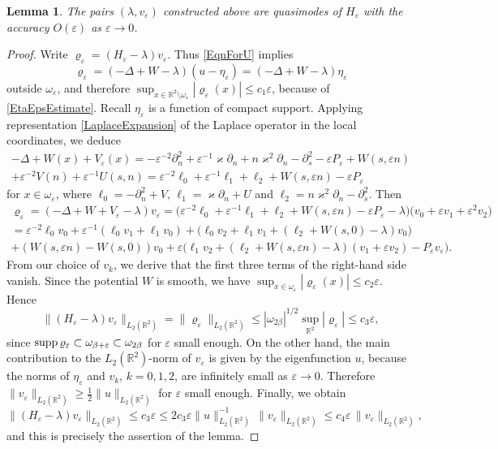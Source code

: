 \documentclass[reqno]{amsart}
\theoremstyle{plain}
\newtheorem{lem}{Lemma}
\numberwithin{equation}{section}
\newcommand{\supp}{\mathop{\rm supp}}
\renewcommand{\kappa}{\varkappa}
\newcommand{\Real}{\mathbb R}
\newcommand{\eps}{\varepsilon}
\renewcommand{\leq}{\leqslant}
\renewcommand{\geq}{\geqslant}
\begin{document}
\begin{lem}\label{LemmaQuasimodesHeps}
 The pairs $(\lambda, v_\eps)$ constructed above are quasimodes of $H_\eps$ with the accuracy $O(\eps)$ as $\eps\to 0$.
\end{lem}
\begin{proof}



Write $\varrho_\eps=(H_\eps-\lambda)v_\eps$.
Thus \eqref{EqnForU} implies
\begin{equation*}
 \varrho_\eps=(-\Delta+W-\lambda)( u-\eta_\eps)=(-\Delta+W-\lambda)\eta_\eps
\end{equation*}
outside $\omega_\eps$, and therefore $\sup_{x\in\Real^2\setminus \omega_\eps}|\varrho_\eps(x)|\leq c_1\eps$, because of \eqref{EtaEpsEstimate}. Recall $\eta_\eps$ is a function of compact support.
Applying representation \eqref{LaplaceExpansion} of the Laplace operator in the local coordinates, we deduce
\begin{multline*}
-\Delta+W(x)+V_\eps(x)
=-\eps^{-2}\partial^2_n+\eps^{-1}\kappa\partial_n
+n\kappa^2\partial_n-\partial^2_s-\eps P_\eps
+W(s,\eps n)\\
+ \eps^{-2}V(n)+\eps^{-1}U(s,n) =\eps^{-2}\ell_0+\eps^{-1}\ell_1+\ell_2+W(s,\eps n)-\eps P_\eps
\end{multline*}
for $x\in \omega_\eps$, where $\ell_0=-\partial^2_n+V$, $\ell_1=\kappa\partial_n
+U$ and $\ell_2=n\kappa^2\partial_n-\partial^2_s$. Then
\begin{multline*}
  \varrho_\eps=(-\Delta+W+V_\eps -\lambda)v_\eps
  =\big(\eps^{-2}\ell_0+\eps^{-1}\ell_1+\ell_2+W(s,\eps n)-\eps P_\eps-\lambda\big)\big(v_0+\eps v_1+\eps^2 v_2\big)\\
  =\eps^{-2}\ell_0v_0+\eps^{-1}(\ell_0v_1+\ell_1v_0)+\big(\ell_0v_2+\ell_1v_1
  +(\ell_2+W(s,0)-\lambda)v_0\big)
  \\
  +(W(s,\eps n)-W(s,0))v_0+\eps \big(\ell_1v_2+(\ell_2+W(s,\eps n)-\lambda)
  (v_1+\eps v_2) - P_\eps v_\eps\big).
\end{multline*}
From our choice of $v_k$, we derive that the first three terms of the right-hand side vanish. Since the potential $W$ is smooth, we have
$\sup_{x\in\omega_\eps}|\varrho_\eps(x)|\leq c_2\eps$.
Hence
\begin{equation*}
  \|(H_\eps-\lambda)v_\eps\|_{L_2(\Real^2)}=
  \|\varrho_\eps\|_{L_2(\Real^2)}\leq |\omega_{2\beta}|^{1/2}\sup_{\Real^2}|\varrho_\eps|\leq c_3 \eps,
\end{equation*}
since $\supp \varrho_\eps\subset \omega_{\beta+\eps}\subset \omega_{2\beta}$ for $\eps$ small enough.
On the other hand, the main contribution  to the $L_2(\Real^2)$-norm of $v_\eps$ is given by the eigenfunction $u$, because the norms of $\eta_\eps$ and $v_k$, $k=0,1,2$, are infinitely small  as $\eps\to 0$. Therefore $\|v_\eps\|_{L_2(\Real^2)}\geq \frac{1}{2}\|u\|_{L_2(\Real^2)}$ for $\eps$ small enough.
 Finally, we obtain
\begin{equation*}
 \|(H_\eps-\lambda)v_\eps\|_{L_2(\Real^2)}\leq c_3 \eps
 \leq 2c_3 \eps\|u\|_{L_2(\Real^2)}^{-1}\,\|v_\eps\|_{L_2(\Real^2)}\leq c_4 \eps\,\|v_\eps\|_{L_2(\Real^2)},
\end{equation*}
and this is precisely the assertion of the lemma.
\end{proof}
\end{document}
